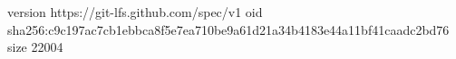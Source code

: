 version https://git-lfs.github.com/spec/v1
oid sha256:c9c197ac7cb1ebbca8f5e7ea710be9a61d21a34b4183e44a11bf41caadc2bd76
size 22004
